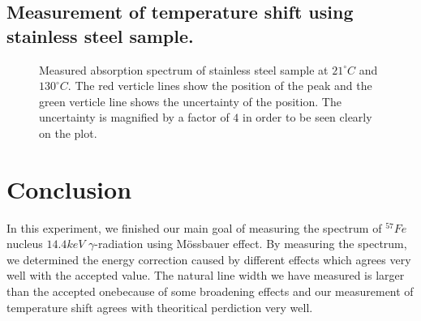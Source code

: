 \documentclass[aps,twocolumn,secnumarabic,balancelastpage,amsmath,amssymb,nofootinbib]{revtex4}
\begin{document}
\subsection{Measurement of temperature shift using stainless steel sample.}
\begin{figure}
  \caption{Measured absorption spectrum of stainless steel sample at  $21^{\circ}C$ and  $130^{\circ}C$. The red verticle lines show the position of the peak and the green verticle line shows the uncertainty of the position. The uncertainty is magnified by a factor of $4$ in order to be seen clearly on the plot.}
  \label{temp_raw}
\end{figure}

\section{Conclusion}
In this experiment, we finished our main goal of measuring the spectrum of ${}^{57}Fe$ nucleus $14.4keV$ $\gamma$-radiation using M\"{o}ssbauer effect. By measuring the spectrum, we determined the energy correction caused by different effects which agrees very well with the accepted value. The natural line width we have measured is larger than the accepted onebecause of some broadening effects and our measurement of temperature shift agrees with theoritical perdiction very well.


\end{document}
